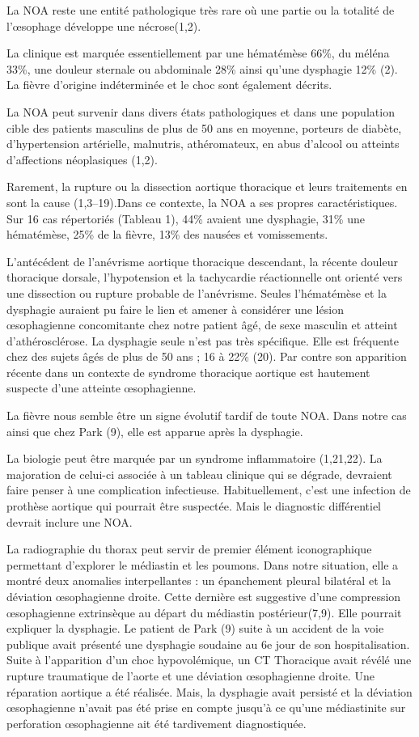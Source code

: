 \documentclass[./tfe.tex]{subfiles}
\begin{document}
La NOA reste une entité pathologique très rare où une partie ou la totalité de l’œsophage développe une nécrose(1,2).

La clinique est marquée essentiellement par une hématémèse 66\%, du méléna 33\%, une douleur sternale ou abdominale 28\% ainsi qu’une dysphagie 12\% (2). La fièvre d'origine indéterminée et le choc sont également décrits.

La NOA peut survenir dans divers états pathologiques et dans une population cible des patients masculins de plus de 50 ans en moyenne, porteurs de diabète, d’hypertension artérielle, malnutris, athéromateux, en abus d’alcool ou atteints d’affections néoplasiques (1,2).

Rarement, la rupture ou la dissection aortique thoracique et leurs traitements en sont la cause (1,3–19).Dans ce contexte, la NOA a ses propres caractéristiques. Sur 16 cas répertoriés (Tableau 1), 44\% avaient une dysphagie, 31\% une hématémèse, 25\% de la fièvre, 13\% des nausées et vomissements.

L’antécédent de l’anévrisme aortique thoracique descendant, la récente douleur thoracique dorsale, l’hypotension et la tachycardie réactionnelle ont orienté vers une dissection ou rupture probable de l’anévrisme. Seules l’hématémèse et la dysphagie auraient pu faire le lien et amener à considérer une lésion œsophagienne concomitante chez notre patient âgé, de sexe masculin et atteint d’athérosclérose. La dysphagie seule n’est pas très spécifique. Elle est fréquente chez des sujets âgés de plus de 50 ans ; 16 à 22\% (20). Par contre son apparition récente dans un contexte de syndrome thoracique aortique est hautement suspecte d’une atteinte œsophagienne.

La fièvre nous semble être un signe évolutif tardif de toute NOA. Dans notre cas ainsi que chez Park (9), elle est apparue après la dysphagie.

La biologie peut être marquée par un syndrome inflammatoire (1,21,22). La majoration de celui-ci associée à un tableau clinique qui se dégrade, devraient faire penser à une complication infectieuse. Habituellement, c’est une infection de prothèse aortique qui pourrait être suspectée. Mais le diagnostic différentiel devrait inclure une NOA.

La radiographie du thorax peut servir de premier élément iconographique permettant d’explorer le médiastin et les poumons. Dans notre situation, elle a montré deux anomalies interpellantes : un épanchement pleural bilatéral et la déviation œsophagienne droite. Cette dernière est suggestive d’une compression œsophagienne extrinsèque au départ du médiastin postérieur(7,9). Elle pourrait expliquer la dysphagie. Le patient de Park (9) suite à un accident de la voie publique avait présenté une dysphagie soudaine au 6e jour de son hospitalisation. Suite à l’apparition d’un choc hypovolémique, un CT Thoracique avait révélé une rupture traumatique de l’aorte et une déviation œsophagienne droite. Une réparation aortique a été réalisée. Mais, la dysphagie avait persisté et la déviation œsophagienne n’avait pas été prise en compte jusqu’à ce qu’une médiastinite sur perforation œsophagienne ait été tardivement diagnostiquée.
\end{document}
